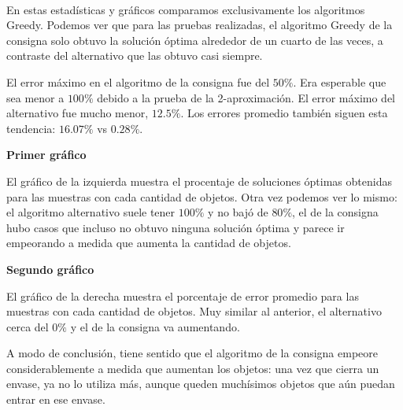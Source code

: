 \documentclass[11pt]{article}
\begin{document}
    \begin{center}
    \end{center}
    { \hspace*{\fill} \\}
    
    En estas estadísticas y gráficos comparamos exclusivamente los
algoritmos Greedy. Podemos ver que para las pruebas realizadas, el
algoritmo Greedy de la consigna solo obtuvo la solución óptima alrededor
de un cuarto de las veces, a contraste del alternativo que las obtuvo
casi siempre.

El error máximo en el algoritmo de la consigna fue del \(50\%\). Era
esperable que sea menor a \(100\%\) debido a la prueba de la
2-aproximación. El error máximo del alternativo fue mucho menor,
\(12.5\%\). Los errores promedio también siguen esta tendencia:
\(16.07\%\) vs \(0.28\%\).

\textbf{Primer gráfico}

El gráfico de la izquierda muestra el procentaje de soluciones óptimas
obtenidas para las muestras con cada cantidad de objetos. Otra vez
podemos ver lo mismo: el algoritmo alternativo suele tener \(100\%\) y
no bajó de \(80\%\), el de la consigna hubo casos que incluso no obtuvo
ninguna solución óptima y parece ir empeorando a medida que aumenta la
cantidad de objetos.

\textbf{Segundo gráfico}

El gráfico de la derecha muestra el porcentaje de error promedio para
las muestras con cada cantidad de objetos. Muy similar al anterior, el
alternativo cerca del \(0\%\) y el de la consigna va aumentando.

A modo de conclusión, tiene sentido que el algoritmo de la consigna
empeore considerablemente a medida que aumentan los objetos: una vez que
cierra un envase, ya no lo utiliza más, aunque queden muchísimos objetos
que aún puedan entrar en ese envase.


    
    
    
\end{document}
